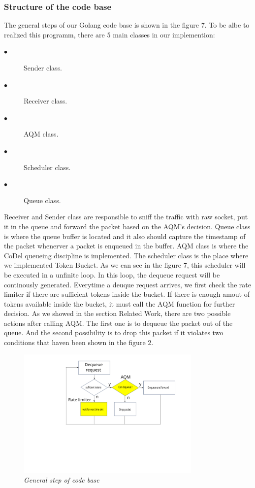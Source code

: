 \subsubsection{Structure of the code base}
The general steps of our Golang code base is shown in the figure 7. To be albe to realized this programm, there are 5 main classes in our implemention:
\begin{description}
  \item[$\bullet$] Sender class.
  \item[$\bullet$] Receiver class.
   \item[$\bullet$] AQM class.
   \item[$\bullet$] Scheduler class.
   \item[$\bullet$] Queue class.	
   
\end{description}
Receiver and Sender class are responsible to sniff the traffic with raw socket, put it in the queue and forward the packet based on the AQM's decision. Queue class is where the queue buffer is located and it also should capture the timestamp of the packet whenerver a packet is enqueued in the buffer. AQM class is where the CoDel queueing discipline is implemented. The scheduler class is the place where we implemented Token Bucket. As we can see in the figure 7, this scheduler will be executed in a unfinite loop. In this loop, the dequeue request will be continously generated. Everytime a deuque request arrives, we first check the rate limiter if there are sufficient tokens inside the bucket. If there is enough amout of tokens available inside the bucket, it must call the AQM function for further decision. As we showed in the section Related Work, there are two possible actions after calling AQM. The first one is to dequeue the packet out of the queue. And the second possibility is to drop this packet if it violates two conditions that haven been shown in the figure 2. 
\begin{figure}[h]
\centering
\includegraphics*[width=9cm]{codebase}
\caption{\em General step of code base}
\label{fig:tcp}
\end{figure}



